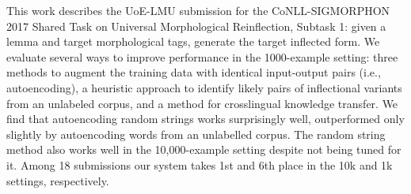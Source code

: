 This work describes the UoE-LMU submission for the CoNLL-SIGMORPHON 2017 Shared Task on Universal Morphological Reinflection, Subtask 1: given a lemma and target morphological tags, generate the target inflected form. We evaluate several ways to improve performance in the 1000-example setting: three methods to augment the training data with identical input-output pairs (i.e., autoencoding), a heuristic approach to identify likely pairs of inflectional variants from an unlabeled corpus, and a method for crosslingual knowledge transfer. We find that autoencoding random strings works surprisingly well, outperformed only slightly by autoencoding words from an unlabelled corpus. The random string method also works well in the 10,000-example setting despite not being tuned for it. Among 18 submissions our system takes 1st and 6th place in the 10k and 1k settings, respectively.
